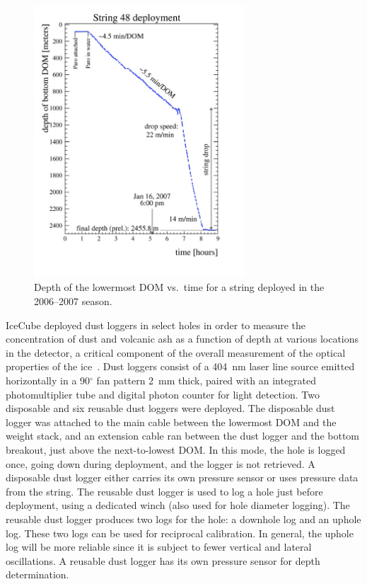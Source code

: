 \begin{figure}[!h]
 \centering
 \includegraphics[width=0.70\textwidth]{graphics/drill/String48_profile.pdf}
\caption{Depth of the lowermost DOM vs.~time for a string deployed in the
  2006--2007 season.}
\label{fig:deploytime}
\end{figure}

IceCube deployed dust loggers in select holes in order to measure the
concentration of dust and volcanic ash as a function of depth at various
locations in the detector, a critical component of the overall measurement
of the optical properties of the
ice~\cite{Aartsen:2013rt,citeulike:2998650}. Dust loggers 
consist of a 404~nm laser line source emitted horizontally in a
90$^{\circ}$ fan pattern 2~mm thick, paired with an integrated
photomultiplier tube and digital photon counter for light detection. Two
disposable and six reusable dust loggers were deployed. The disposable dust
logger was attached to the main cable between the lowermost DOM and the
weight stack, and an extension cable ran between the dust logger and the
bottom breakout, just above the next-to-lowest DOM. In this mode, the hole
is logged once, going down during deployment, and the logger is not
retrieved. A disposable dust logger either carries its own pressure sensor
or uses pressure data from the string. The reusable dust logger is used to
log a hole just before deployment, using a dedicated winch (also used for
hole diameter logging). The reusable dust logger produces two logs for the
hole: a downhole log and an uphole log. These two logs can be used for
reciprocal calibration. In general, the uphole log will be more reliable
since it is subject to fewer vertical and lateral oscillations. A reusable
dust logger has its own pressure sensor for depth determination.

